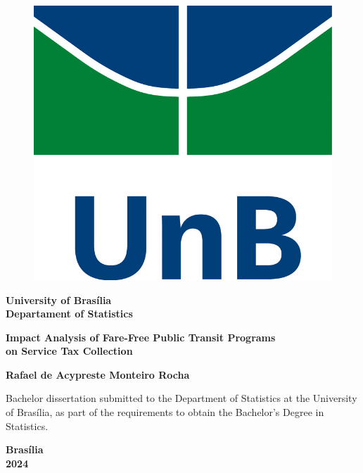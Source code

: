 \documentclass[12pt, a4paper, twoside]{article}
\numberwithin{equation}{subsection} %
\newcommand{\titulo}{Impact Analysis of Fare-Free Public Transit
Programs \\ on Service Tax Collection}
\newcommand{\autor}{Rafael de Acypreste Monteiro Rocha}
\begin{document}
\begin{titlepage}
\begin{center}
\begin{figure}[h!]
	\centering
		\includegraphics[scale = 0.6]{img/as_vert_cor.jpg}
	\label{fig:unb}
\end{figure}
{\bf University of Brasília \\
\bf Departament of Statistics}
\vspace{5cm}

\setcounter{page}{0}
\null
\textbf{\titulo}
\vspace{2.5cm}


\vspace{0.2cm}
\textbf{\autor}
\end{center}
\vspace{1.5cm}

\begin{flushright}
\begin{minipage}{7.5cm}
\parbox[t]{7.5cm}{Bachelor dissertation submitted to the Department of
Statistics at the University of Brasília, as part of the requirements to
obtain the Bachelor's Degree in Statistics.}
\end{minipage}
\end{flushright}

\vspace{5cm}

\begin{center}
{\bf{Brasília} \\ }
\bf{2024}
\end{center}
\end{titlepage}
\end{document}

